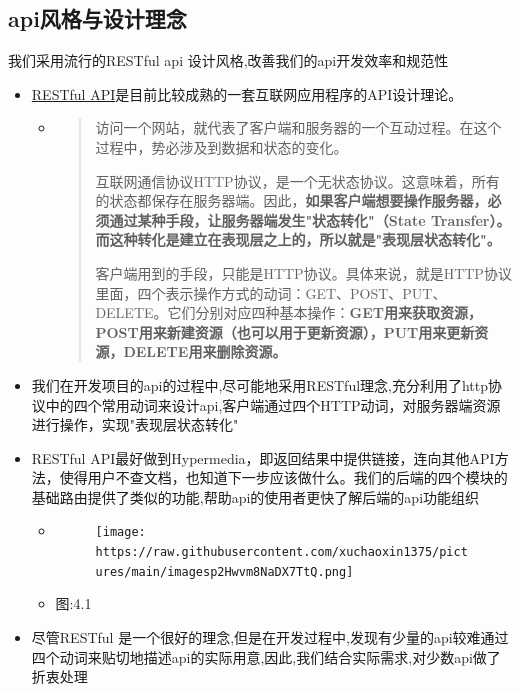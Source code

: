 \documentclass[
]{article}
\begin{document}
\hypertarget{apiux98ceux683cux4e0eux8bbeux8ba1ux7406ux5ff5}{%
\subsection{api风格与设计理念}\label{apiux98ceux683cux4e0eux8bbeux8ba1ux7406ux5ff5}}

我们采用流行的RESTful api 设计风格,改善我们的api开发效率和规范性

\begin{itemize}
\item
  \href{https://en.wikipedia.org/wiki/Representational_state_transfer}{RESTful
  API}是目前比较成熟的一套互联网应用程序的API设计理论。

  \begin{itemize}
  \item
    \begin{quote}
    访问一个网站，就代表了客户端和服务器的一个互动过程。在这个过程中，势必涉及到数据和状态的变化。

    互联网通信协议HTTP协议，是一个无状态协议。这意味着，所有的状态都保存在服务器端。因此，\textbf{如果客户端想要操作服务器，必须通过某种手段，让服务器端发生"状态转化"（State
    Transfer）。而这种转化是建立在表现层之上的，所以就是"表现层状态转化"。}

    客户端用到的手段，只能是HTTP协议。具体来说，就是HTTP协议里面，四个表示操作方式的动词：GET、POST、PUT、DELETE。它们分别对应四种基本操作：\textbf{GET用来获取资源，POST用来新建资源（也可以用于更新资源），PUT用来更新资源，DELETE用来删除资源。}
    \end{quote}
  \end{itemize}
\item
  我们在开发项目的api的过程中,尽可能地采用RESTful理念,充分利用了http协议中的四个常用动词来设计api,客户端通过四个HTTP动词，对服务器端资源进行操作，实现"表现层状态转化"
\item
  RESTful
  API最好做到Hypermedia，即返回结果中提供链接，连向其他API方法，使得用户不查文档，也知道下一步应该做什么。我们的后端的四个模块的基础路由提供了类似的功能,帮助api的使用者更快了解后端的api功能组织

  \begin{itemize}
  \item
    \begin{figure}
    \centering
    \texttt{[image: https://raw.githubusercontent.com/xuchaoxin1375/pictures/main/imagesp2Hwvm8NaDX7TtQ.png]}
    \caption{}
    \end{figure}
  \item
    图:4.1
  \end{itemize}
\item
  尽管RESTful
  是一个很好的理念,但是在开发过程中,发现有少量的api较难通过四个动词来贴切地描述api的实际用意,因此,我们结合实际需求,对少数api做了折衷处理
\end{itemize}
\end{document}
